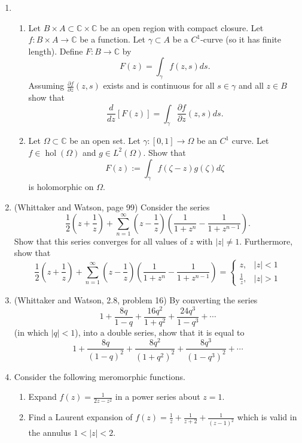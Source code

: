 \documentclass[a4paper,10pt]{article}
\newcommand{\CC}{\mathbb{C}}
\newcommand{\hol}{\operatorname{hol}}
\begin{document}
\begin{enumerate}
\item 
\begin{enumerate}
\item 
Let $B\times A \subset \CC \times \CC$ be an open region with compact closure.
Let $f: B\times A \to \CC$ be a function.  Let $\gamma \subset A$ be a $C^1$-curve (so it has finite length). 
Define $F: B \to \CC$ by  
 $$ F(z) = \int_{\gamma} f(z,s) ds.$$
Assuming $\frac{\partial f}{\partial z}(z,s)$ exists and is continuous for all $s \in \gamma$ and all $z \in B$ show that 
 $$ \frac{d}{dz}[ F(z)] = \int_{\gamma} \frac{\partial f}{\partial z}(z,s) ds. $$
\item Let $\Omega \subset \CC$ be an open set. Let $\gamma:[0,1]\to \Omega$ be an $C^1$ curve. 
Let $f \in \hol(\Omega)$ and $g \in L^2(\Omega)$. Show that 
 $$ F(z) := \int_{\gamma} f(\zeta-z)g(\zeta)d \zeta $$ 
is holomorphic on $\Omega$.
\end{enumerate}


\item (Whittaker and Watson, page 99)
Consider the series 
 $$ \frac{1}{2} \left( z + \frac{1}{z} \right) + \sum_{n=1}^\infty \left( z - \frac{1}{z} \right) \left( \frac{1}{1+z^n} - \frac{1}{1+z^{n-1}} \right). $$
Show that this series converges for all values of $z$ with $\vert z \vert \neq 1$. 
Furthermore, show that 
$$ \frac{1}{2} \left( z + \frac{1}{z} \right) + \sum_{n=1}^\infty \left( z - \frac{1}{z} \right) \left( \frac{1}{1+z^n} - \frac{1}{1+z^{n-1}} \right) = \begin{cases}
z, & \vert z \vert <1 \\
\frac{1}{z}, & \vert z \vert > 1
\end{cases}$$

\item (Whittaker and Watson, 2.8, problem 16)
By converting the series 
 $$1 + \frac{8q}{1-q} + \frac{16q^2}{1+q^2} + \frac{24q^3}{1-q^3} + \cdots $$ 
(in which $\vert q \vert<1$), into a double series, show that it is equal to 
 $$ 1 + \frac{8q}{(1-q)^2}+ \frac{8q^2}{(1+q^2)^2} + \frac{8q^3}{(1-q^3)^2} + \cdots $$
 	
 	\item Consider the following meromorphic functions.
 	
 	\begin{enumerate}
 		\item Expand $f(z) = \frac{1}{2z - z^2}$ in a power series about $z = 1$.
 		
 		\item Find a Laurent expansion of $f(z) = \frac{1}{z} + \frac{1}{z + 2} + \frac{1}{(z - 1)^2}$ which is valid in the annulus $1 < |z| < 2$.
 	\end{enumerate}
 	

\end{enumerate}
\end{document}
